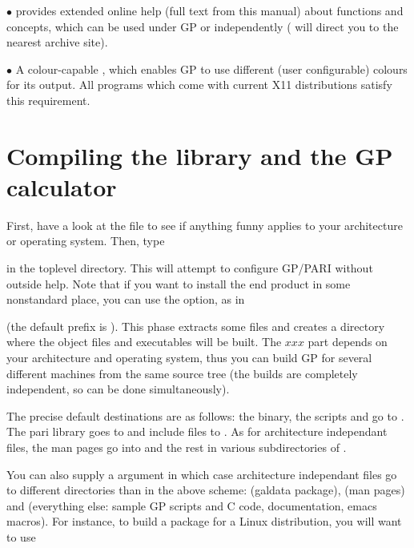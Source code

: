   $\bullet$  provides extended online help (full text from this
manual) about functions and concepts, which can be used under GP or
independently ( will direct you to the nearest
 archive site).

  $\bullet$ A colour-capable , which enables GP to use different
(user configurable) colours for its output. All  programs which
come with current X11 distributions satisfy this requirement.
\vfill\eject
\section{Compiling the library and the GP calculator}

 First, have a look at the  file
to see if anything funny applies to your architecture or operating system.
Then, type 


\noindent in the toplevel directory. This will attempt to configure GP/PARI
without outside help. Note that if you want to install the end product in
some nonstandard place, you can use the  option, as in


\noindent (the default prefix is ). This phase extracts some
files and creates a directory  where the object files and
executables will be built. The $xxx$ part depends on your architecture and
operating system, thus you can build GP for several different machines from
the same source tree (the builds are completely independent, so can be done
simultaneously).

 The precise default destinations are as follows:
the  binary, the scripts  and  go to
. The pari library goes to  and include
files to . As for architecture independant files,
the man pages go into  and the rest in various
subdirectories of .

\noindent You can also supply a  argument in which case
architecture independant files go to different directories than in the above
scheme:  (galdata package),  (man pages)
and  (everything else: sample GP scripts and C code,
documentation, emacs macros). For instance, to build a package for a Linux
distribution, you will want to use

